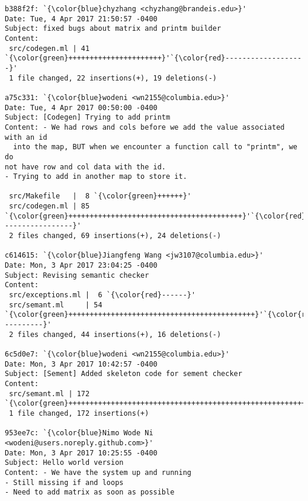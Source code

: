 \begin{lstlisting}
b388f2f: `{\color{blue}chyzhang <chyzhang@brandeis.edu>}'
Date: Tue, 4 Apr 2017 21:50:57 -0400
Subject: fixed bugs about matrix and printm builder
Content: 
 src/codegen.ml | 41 `{\color{green}++++++++++++++++++++++}'`{\color{red}-------------------}'
 1 file changed, 22 insertions(+), 19 deletions(-)

a75c331: `{\color{blue}wodeni <wn2155@columbia.edu>}'
Date: Tue, 4 Apr 2017 00:50:00 -0400
Subject: [Codegen] Trying to add printm
Content: - We had rows and cols before we add the value associated with an id
  into the map, BUT when we encounter a function call to "printm", we do
not have row and col data with the id.
- Trying to add in another map to store it.

 src/Makefile   |  8 `{\color{green}++++++}'
 src/codegen.ml | 85 `{\color{green}+++++++++++++++++++++++++++++++++++++++++}'`{\color{red}-----------------}'
 2 files changed, 69 insertions(+), 24 deletions(-)

c614615: `{\color{blue}Jiangfeng Wang <jw3107@columbia.edu>}'
Date: Mon, 3 Apr 2017 23:04:25 -0400
Subject: Revising semantic checker
Content: 
 src/exceptions.ml |  6 `{\color{red}------}'
 src/semant.ml     | 54 `{\color{green}++++++++++++++++++++++++++++++++++++++++++++}'`{\color{red}----------}'
 2 files changed, 44 insertions(+), 16 deletions(-)

6c5d0e7: `{\color{blue}wodeni <wn2155@columbia.edu>}'
Date: Mon, 3 Apr 2017 10:42:57 -0400
Subject: [Sement] Added skeleton code for sement checker
Content: 
 src/semant.ml | 172 `{\color{green}++++++++++++++++++++++++++++++++++++++++++++++++++++++++++}'
 1 file changed, 172 insertions(+)

953ee7c: `{\color{blue}Nimo Wode Ni <wodeni@users.noreply.github.com>}'
Date: Mon, 3 Apr 2017 10:25:55 -0400
Subject: Hello world version
Content: - We have the system up and running
- Still missing if and loops
- Need to add matrix as soon as possible



\end{lstlisting}
